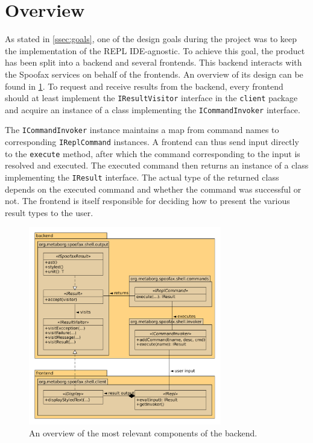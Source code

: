 \section{Overview}
\label{sec:overview}

As stated in \cref{ssec:goals}, one of the design goals during the project was
to keep the implementation of the REPL IDE-agnostic. To achieve this goal, the
product has been split into a backend and several frontends. This backend
interacts with the Spoofax services on behalf of the frontends. An overview of
its design can be found in \cref{fig:uml-overview}. To request and receive
results from the backend, every frontend should at least implement the
\texttt{IResultVisitor} interface in the \texttt{client} package and
acquire an instance of a class implementing the \texttt{ICommandInvoker}
interface.

The \texttt{ICommandInvoker} instance maintains a map from command names to
corresponding \texttt{IReplCommand} instances. A frontend can thus send
input directly to the \texttt{execute} method, after which the command
corresponding to the input is resolved and executed. The executed command
then returns an instance of a class implementing the \texttt{IResult}
interface. The actual type of the returned class depends on the executed command
and whether the command was successful or not. The frontend is itself
responsible for deciding how to present the various result types to the user.

\begin{figure}[h!]
  \centering
  \includegraphics[width=0.75\textwidth]{uml-overview}
  \caption{An overview of the most relevant components of the backend.}
  \label{fig:uml-overview}
\end{figure}
